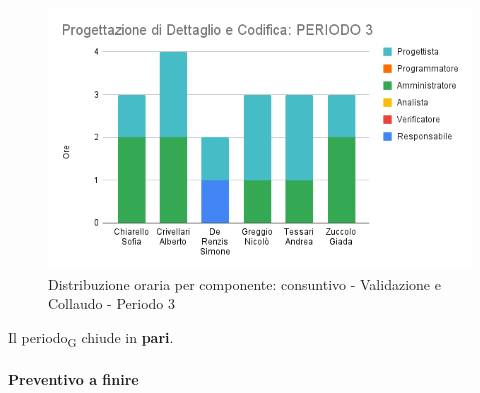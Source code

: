 \begin{figure}[H]
	\centering
	\includegraphics[scale=0.6]{res/images/charts/consuntivo/prog_dett_3.png}
	\caption{Distribuzione oraria per componente: consuntivo - Validazione e Collaudo - Periodo 3}
\end{figure}


Il periodo\textsubscript{G} chiude in \textbf{pari}.


\paragraph{Preventivo a finire}
\subparagraph*{}

\pafTable{
	
}
